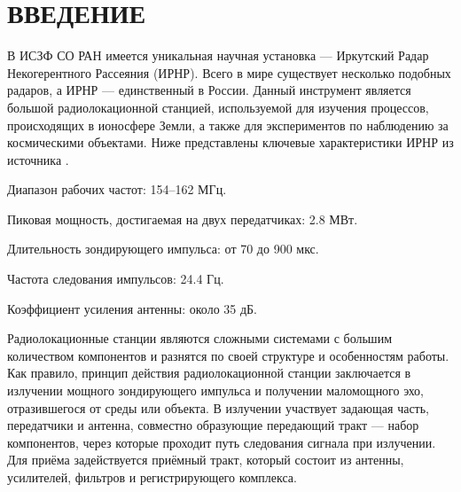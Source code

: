\documentclass{report}
\begin{document}



\setcounter{page}{2} %
\tableofcontents  %

\setcounter{chapter}{0} %
\setcounter{section}{0} %
\setcounter{subsection}{0} %
\setcounter{equation}{0} %


\chapter*{ВВЕДЕНИЕ} %

В ИСЗФ СО РАН имеется уникальная научная установка --- Иркутский Радар Некогерентного Рассеяния (ИРНР). Всего в мире существует несколько подобных радаров, а ИРНР --- единственный в России. Данный инструмент является большой радиолокационной станцией, используемой для изучения процессов, происходящих в ионосфере Земли, а также для экспериментов по наблюдению за космическими объектами. Ниже представлены ключевые характеристики ИРНР из источника \cite{irnr1}.

\begin{enummarker}
    \item Диапазон рабочих частот: 154--162 МГц.
    \item Пиковая мощность, достигаемая на двух передатчиках: 2.8 МВт.
    \item Длительность зондирующего импульса: от 70 до 900 мкс.
    \item Частота следования импульсов: 24.4 Гц.
    \item Коэффициент усиления антенны: около 35 дБ.
\end{enummarker}

Радиолокационные станции являются сложными системами с большим количеством компонентов и разнятся по своей структуре и особенностям работы. Как правило, принцип действия радиолокационной станции заключается в излучении мощного зондирующего импульса и получении маломощного эхо, отразившегося от среды или объекта. В излучении участвует задающая часть, передатчики и антенна, совместно образующие передающий тракт --- набор компонентов, через которые проходит путь следования сигнала при излучении. Для приёма задействуется приёмный тракт, который состоит из антенны, усилителей, фильтров и регистрирующего комплекса.
\end{document}
